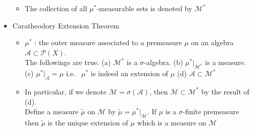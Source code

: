 \documentclass[12pt]{article}
\newcommand{\A}{\mathcal{A}}
\begin{document}
\begin{itemize}
\begin{itemize}
        \item The collection of all $\mu^*$-measurable sets is denoted by $\mathcal{M}^*$
    \end{itemize} 
    \item Caratheodory Extension Theorem
    \begin{itemize}
        \item $\mu^*$ : the outer measure associated to a premeasure $\mu$ on an algebra $\A\subset \mathcal{P}(X)$. \\ The followings are true. \quad (a) $\mathcal{M}^*$ is a $\sigma$-algebra. \; (b) $\mu^*|_{\mathcal{M}^*}$ is a measure. \\ (c) $\mu^*|_\A = \mu$ \; i.e. \, $\mu^*$ is indeed an extension of $\mu$ \quad (d) $\A\subset \mathcal{M}^*$ 
        \item In particular, if we denote $\mathcal{M}=\sigma(\A)$, then $\mathcal{M}\subset \mathcal{M}^*$ by the result of (d). \\ Define a measure $\tilde \mu$ on $\mathcal{M}$ by $\tilde\mu=\mu^*|_\mathcal{M}$. If $\mu$ is a $\sigma$-finite premeasure \\then $\tilde\mu$ is the unique extension of $\mu$ which is a measure on $\mathcal{M}$
    \end{itemize}
\end{itemize}
\clearpage
\end{document}

